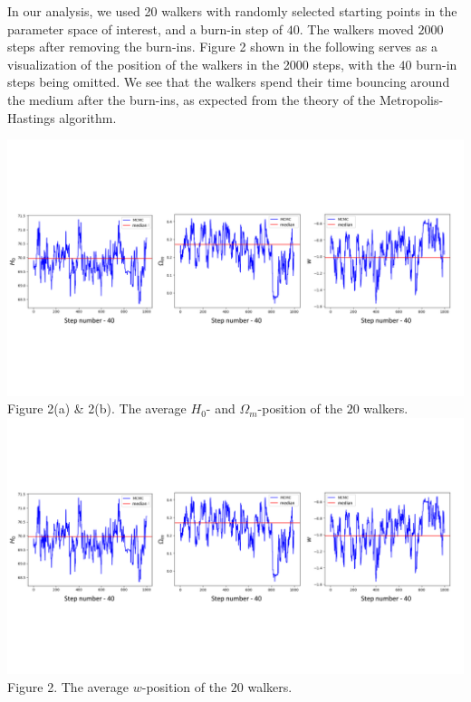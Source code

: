 \documentclass[11pt]{article}
\theoremstyle{break}
\theoremstyle{break}
\begin{document}
${}$\qquad In our analysis, we used 20 walkers with randomly selected starting points in the parameter space of interest, and a burn-in step of $40$. The walkers moved $2000$ steps after removing the burn-ins. Figure 2 shown in the following serves as a visualization of the position of the walkers in the 2000 steps, with the $40$ burn-in steps being omitted. We see that the walkers spend their time bouncing around the medium after the burn-ins, as expected from the theory of the Metropolis-Hastings algorithm.


\begin{center}
\includegraphics[scale=0.68]{steps1}\\


Figure 2(a) \& 2(b). The average $H_0$- and $\Omega_m$-position of the $20$ walkers.\\
\includegraphics[scale=0.68]{steps2}\\

Figure 2. The average $w$-position of the $20$ walkers. \\

\end{center}
\hfill\break
\end{document}
